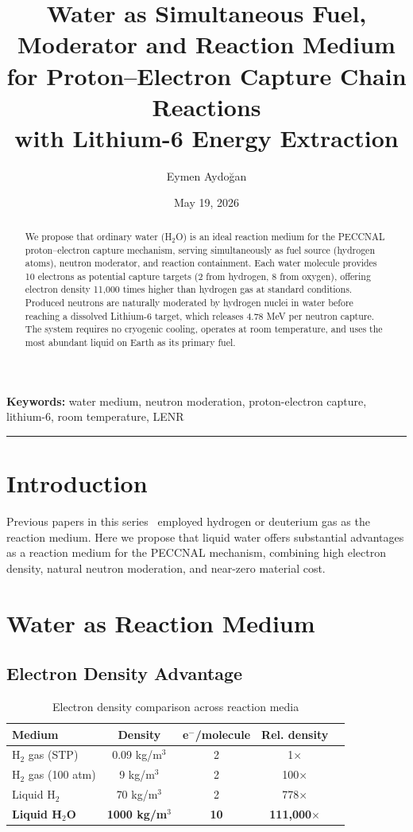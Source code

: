 \documentclass[12pt,a4paper]{article}
\title{\textbf{Water as Simultaneous Fuel, Moderator and Reaction Medium\\
for Proton--Electron Capture Chain Reactions\\
with Lithium-6 Energy Extraction}}
\author{Eymen Aydoğan}
\date{May 19, 2026}
\begin{document}
\maketitle

\begin{abstract}
We propose that ordinary water (H$_2$O) is an ideal reaction medium
for the PECCNAL proton--electron capture mechanism, serving
simultaneously as fuel source (hydrogen atoms), neutron moderator,
and reaction containment. Each water molecule provides 10 electrons
as potential capture targets (2 from hydrogen, 8 from oxygen),
offering electron density 11,000 times higher than hydrogen gas at
standard conditions. Produced neutrons are naturally moderated by
hydrogen nuclei in water before reaching a dissolved Lithium-6
target, which releases 4.78 MeV per neutron capture. The system
requires no cryogenic cooling, operates at room temperature, and
uses the most abundant liquid on Earth as its primary fuel.
\end{abstract}

\noindent\textbf{Keywords:} water medium, neutron moderation,
proton-electron capture, lithium-6, room temperature, LENR

\hrule\vspace{1em}

\section{Introduction}
Previous papers in this series~\cite{aydogan2026a} employed
hydrogen or deuterium gas as the reaction medium. Here we propose
that liquid water offers substantial advantages as a reaction medium
for the PECCNAL mechanism, combining high electron density, natural
neutron moderation, and near-zero material cost.

\section{Water as Reaction Medium}

\subsection{Electron Density Advantage}

\begin{table}[h!]
\centering
\caption{Electron density comparison across reaction media}
\vspace{0.5em}
\begin{tabular}{lcccc}
\toprule
\textbf{Medium} & \textbf{Density} & \textbf{e$^-$/molecule} & \textbf{Rel. density} \\
\midrule
H$_2$ gas (STP) & 0.09 kg/m$^3$ & 2 & 1$\times$ \\
H$_2$ gas (100 atm) & 9 kg/m$^3$ & 2 & 100$\times$ \\
Liquid H$_2$ & 70 kg/m$^3$ & 2 & 778$\times$ \\
\textbf{Liquid H$_2$O} & \textbf{1000 kg/m$^3$} & \textbf{10} & \textbf{111,000$\times$} \\
\bottomrule
\end{tabular}
\end{table}
\end{document}
